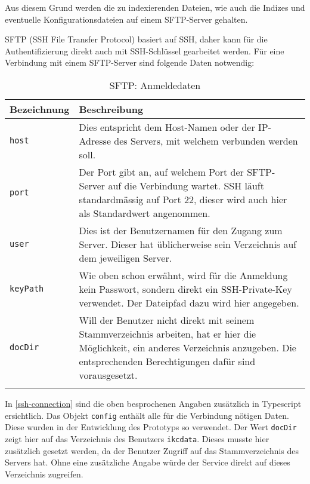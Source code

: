 Aus diesem Grund werden die zu indexierenden Dateien, wie auch die Indizes und eventuelle Konfigurationsdateien auf einem \gls{SFTP}-Server gehalten.

\gls{SFTP} (SSH File Transfer Protocol) basiert auf \gls{SSH}, daher kann für die Authentifizierung direkt auch mit \gls{SSH}-Schlüssel gearbeitet werden. Für eine Verbindung mit einem \gls{SFTP}-Server sind folgende Daten notwendig:


\begin{longtable}{|p{4cm}| p{8cm}|}
  \hline
    \textbf{Bezeichnung} & \textbf{Beschreibung}\\\hline
    \texttt{host} & Dies entspricht dem Host-Namen oder der IP-Adresse des Servers, mit welchem verbunden werden soll.\\\hline
    \texttt{port} & Der Port gibt an, auf welchem Port der \gls{SFTP}-Server auf die Verbindung wartet. \gls{SSH} läuft standardmässig auf Port 22, dieser wird auch hier als Standardwert angenommen.\\\hline
    \texttt{user} & Dies ist der Benutzernamen für den Zugang zum Server. Dieser hat üblicherweise sein Verzeichnis auf dem jeweiligen Server.\\\hline
    \texttt{keyPath} & Wie oben schon erwähnt, wird für die Anmeldung kein Passwort, sondern direkt ein SSH-Private-Key verwendet. Der Dateipfad dazu wird hier angegeben.\\\hline
    \texttt{docDir} & Will der Benutzer nicht direkt mit seinem Stammverzeichnis arbeiten, hat er hier die Möglichkeit, ein anderes Verzeichnis anzugeben. Die entsprechenden Berechtigungen dafür sind vorausgesetzt.\\\hline
        \caption{SFTP: Anmeldedaten}
    \label{sftp-anmeldung}
\end{longtable}


In \autoref{ssh-connection} sind die oben besprochenen Angaben zu\-sätz\-lich in \gls{Typescript} ersichtlich. Das Objekt \texttt{config} enthält alle für die Verbindung nötigen Daten. Diese wurden in der Entwicklung des Prototyps so verwendet. Der Wert \texttt{docDir} zeigt hier auf das Verzeichnis des Benutzers \texttt{ikcdata}. Dieses musste hier zusätzlich gesetzt werden, da der Benutzer Zugriff auf das Stammverzeichnis des Servers hat. Ohne eine zusätzliche Angabe würde der Service direkt auf dieses Verzeichnis zugreifen.



